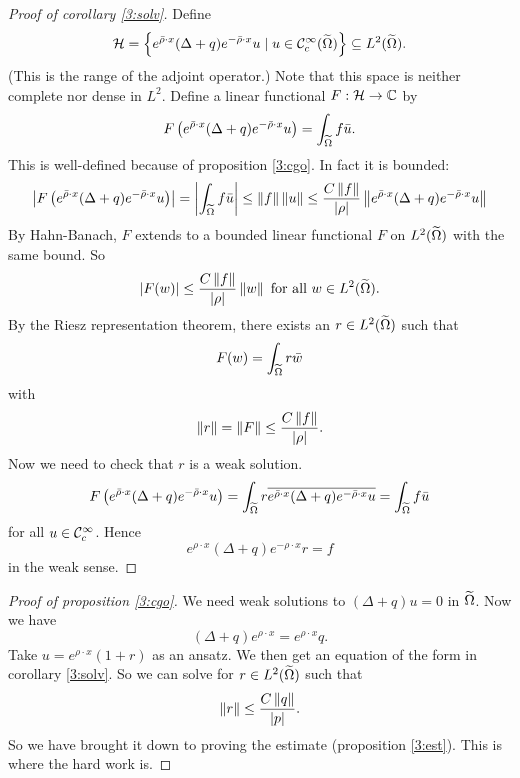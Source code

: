 \begin{proof}[Proof of corollary \ref{3:solv}]
  Define
  \[ \mathcal{H} = \left\{ e^{\bar\rho \cdot x}(\Delta+q)e^{-\bar\rho\cdot x}u \mid u \in \mathcal{C}_c^\infty(\widetilde\Omega) \right\} \subseteq L^2(\widetilde\Omega). \]
  (This is the range of the adjoint operator.)
  Note that this space is neither complete nor dense in $L^2$.
  Define a linear functional $F: \mathcal{H} \to \mathbb{C}$ by
  \[ F\left( e^{\bar\rho \cdot x}(\Delta+q)e^{-\bar\rho\cdot x}u \right) = \int_{\widetilde\Omega} f \bar u. \]
  This is well-defined because of proposition \ref{3:cgo}.
  In fact it is bounded:
  \[ \left\lvert  F\left( e^{\bar\rho \cdot x}(\Delta+q)e^{-\bar\rho\cdot x}u \right)  \right\rvert = \left\lvert  \int_{\widetilde\Omega} f \bar u  \right\rvert \leq \left\lVert f \right\rVert\left\lVert u \right\rVert \leq \frac{C\left\lVert f \right\rVert}{\left\lvert \rho \right\rvert} \left\lVert e^{\bar\rho \cdot x}(\Delta+q)e^{-\bar\rho\cdot x}u \right\rVert \]
  By Hahn-Banach, $F$ extends to a bounded linear functional $F$ on $L^2(\widetilde\Omega)$ with the same bound.
  So
  \[ \left\lvert F(w) \right\rvert \leq \frac{C\left\lVert f \right\rVert}{\left\lvert \rho \right\rvert}\left\lVert w \right\rVert \text{ for all } w \in L^2(\widetilde\Omega). \]
  By the Riesz representation theorem, there exists an $r \in L^2(\widetilde\Omega)$ such that
  \[ F(w) = \int_{\widetilde\Omega} r\bar w \]
  with
  \[ \left\lVert r \right\rVert = \left\lVert F \right\rVert \leq \frac{C\left\lVert f \right\rVert}{\left\lvert \rho \right\rvert}. \]
  Now we need to check that $r$ is a weak solution.
  \[ F \left( e^{\bar\rho \cdot x}(\Delta+q)e^{-\bar\rho\cdot x}u \right) = \int_{\widetilde\Omega} r \overline{ e^{\bar\rho \cdot x}(\Delta+q)e^{-\bar\rho\cdot x}u } = \int_{\widetilde\Omega} f\bar u \]
  for all $u \in \mathcal{C}_c^\infty$.
  Hence
  \[ e^{\rho \cdot x}(\Delta+q)e^{-\rho\cdot x}r = f \]
  in the weak sense.
\end{proof}

\begin{proof}[Proof of proposition \ref{3:cgo}]
  We need weak solutions to $(\Delta+q)u=0$ in $\widetilde\Omega$.
  Now we have
  \[ (\Delta+q)e^{\rho\cdot x} = e^{\rho\cdot x}q. \]
  Take $u=e^{\rho\cdot x}(1+r)$ as an ansatz.
  We then get an equation of the form in corollary \ref{3:solv}.
  So we can solve for $r \in L^2(\widetilde\Omega)$ such that
  \[ \left\lVert r \right\rVert \leq \frac{C\left\lVert q \right\rVert}{\left\lvert p \right\rvert}. \]
  So we have brought it down to proving the estimate (proposition \ref{3:est}).
  This is where the hard work is.
\end{proof}

